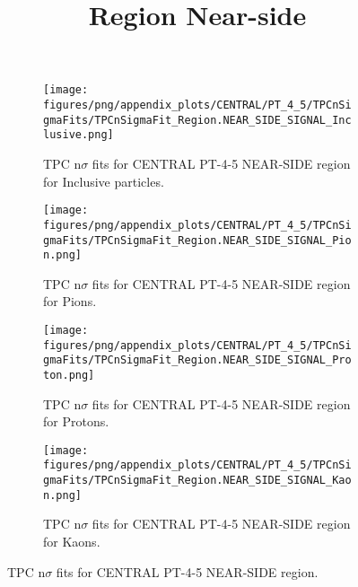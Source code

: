             \begin{figure}[H]
                \title{Region Near-side}
                \begin{subfigure}[b]{0.5\textwidth}
                    \centering
                    \texttt{[image: figures/png/appendix\_plots/CENTRAL/PT\_4\_5/TPCnSigmaFits/TPCnSigmaFit\_Region.NEAR\_SIDE\_SIGNAL\_Inclusive.png]}
                    \caption{TPC n$\sigma$ fits for CENTRAL PT-4-5 NEAR-SIDE region for Inclusive particles.}
                    \label{fig:appendix_CENTRAL_PT-4-5_NEAR_SIDE_SIGNAL_Inclusive}
                \end{subfigure}
                \begin{subfigure}[b]{0.5\textwidth}
                    \centering
                    \texttt{[image: figures/png/appendix\_plots/CENTRAL/PT\_4\_5/TPCnSigmaFits/TPCnSigmaFit\_Region.NEAR\_SIDE\_SIGNAL\_Pion.png]}
                    \caption{TPC n$\sigma$ fits for CENTRAL PT-4-5 NEAR-SIDE region for Pions.}
                    \label{fig:appendix_CENTRAL_PT-4-5_NEAR_SIDE_SIGNAL_Pion}
                \end{subfigure}
                \begin{subfigure}[b]{0.5\textwidth}
                    \centering
                    \texttt{[image: figures/png/appendix\_plots/CENTRAL/PT\_4\_5/TPCnSigmaFits/TPCnSigmaFit\_Region.NEAR\_SIDE\_SIGNAL\_Proton.png]}
                    \caption{TPC n$\sigma$ fits for CENTRAL PT-4-5 NEAR-SIDE region for Protons.}
                    \label{fig:appendix_CENTRAL_PT-4-5_NEAR_SIDE_SIGNAL_Proton}
                \end{subfigure}
                \begin{subfigure}[b]{0.5\textwidth}
                    \centering
                    \texttt{[image: figures/png/appendix\_plots/CENTRAL/PT\_4\_5/TPCnSigmaFits/TPCnSigmaFit\_Region.NEAR\_SIDE\_SIGNAL\_Kaon.png]}
                    \caption{TPC n$\sigma$ fits for CENTRAL PT-4-5 NEAR-SIDE region for Kaons.}
                    \label{fig:appendix_CENTRAL_PT-4-5_NEAR_SIDE_SIGNAL_Kaon}
                \end{subfigure}
                \caption{TPC n$\sigma$ fits for CENTRAL PT-4-5 NEAR-SIDE region.}
                \label{fig:appendix_CENTRAL_PT-4-5_NEAR_SIDE_SIGNAL}
            \end{figure}

